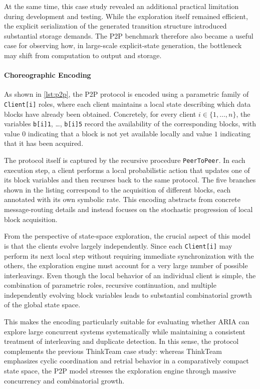 At the same time, this case study revealed an additional practical limitation during development and testing. While the exploration itself remained efficient, the explicit serialization of the generated transition structure introduced substantial storage demands. The P2P benchmark therefore also became a useful case for observing how, in large-scale explicit-state generation, the bottleneck may shift from computation to output and storage.

\paragraph{Choreographic Encoding}
As shown in \cref{lst:p2p}, the P2P protocol is encoded using a parametric family of \texttt{Client[i]} roles, where each client maintains a local state describing which data blocks have already been obtained. Concretely, for every client $i \in \{1, \dots, n\}$, the variables \texttt{b[i]1}, \dots, \texttt{b[i]5} record the availability of the corresponding blocks, with value $0$ indicating that a block is not yet available locally and value $1$ indicating that it has been acquired.

The protocol itself is captured by the recursive procedure \texttt{PeerToPeer}. In each execution step, a client performs a local probabilistic action that updates one of its block variables and then recurses back to the same protocol. The five branches shown in the listing correspond to the acquisition of different blocks, each annotated with its own symbolic rate. This encoding abstracts from concrete message-routing details and instead focuses on the stochastic progression of local block acquisition.

From the perspective of state-space exploration, the crucial aspect of this model is that the clients evolve largely independently. Since each \texttt{Client[i]} may perform its next local step without requiring immediate synchronization with the others, the exploration engine must account for a very large number of possible interleavings. Even though the local behavior of an individual client is simple, the combination of parametric roles, recursive continuation, and multiple independently evolving block variables leads to substantial combinatorial growth of the global state space.

This makes the encoding particularly suitable for evaluating whether \textsc{ARIA} can explore large concurrent systems systematically while maintaining a consistent treatment of interleaving and duplicate detection. In this sense, the protocol complements the previous ThinkTeam case study: whereas ThinkTeam emphasizes cyclic coordination and retrial behavior in a comparatively compact state space, the P2P model stresses the exploration engine through massive concurrency and combinatorial growth.

